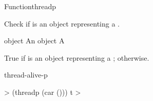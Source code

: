 
\begin{functiondoc}{Function}{threadp}{ 
    \returns{} }
%

\fnsyntax

\fnpurpose Check if  is an object representing a
.

\fnpackage {}

\fnmodule {}

\fnargs
\begin{args}{object}
\arg[object] An object
\arg[boolean] A 
\end{args}

\fnreturns True if  is an object representing a 
; \nil{} otherwise.

\begin{alsos}{thread-alive-p}
\end{alsos}

%
\fnexample
%
\W\supp
\begin{example}
  > (threadp (car ()))
  t
  >
\end{example}

\end{functiondoc}


